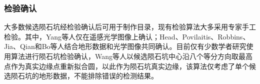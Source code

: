 \subsubsection{检验确认}
大多数候选陨石坑经检验确认后可用于制作目录，现有检验算法大多采用专家手工检验。其中，Yang\cite{yangLunarImpactCrater2020}等人仅在遥感光学图像上确认；Head\cite{headGlobalDistributionLarge2010}、Povilaitis\cite{povilaitisCraterDensityDifferences2018}、Robbins\cite{robbinsNewGlobalDatabase2019}、Jia\cite{jiaCatalogueImpactCraters2020}、Qian\cite{qianCopernicanaged200Ma2021}和Bo\cite{boCatalogueMeterscaleImpact2022}等人结合地形数据和光学图像共同确认。目前仅有少数学者研究使用算法进行陨石坑检验确认，Wang\cite{wangImprovedGlobalCatalog2021}等人以候选陨石坑中心沿八个等分方向取最高点作为真实边缘点重新拟合圆，以此作为陨石坑真实边缘，该算法仅考虑了单个候选陨石坑的地形数据，不能排除错误的检测结果。